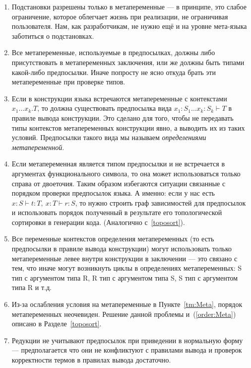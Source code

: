 \begin{enumerate}
\item Подстановки разрешены только в метапеременные --- в принципе, это слабое ограничение, которое облегчает жизнь при реализации, не ограничивая пользователя. Нам, как разработчикам, не нужно ещё и на уровне мета-языка заботиться о подстановках.

\item \label{tm:Meta} Все метапеременные, используемые в предпосылках, должны либо присутствовать в метапеременных заключения, или же должны быть типами какой-либо предпосылки. Иначе попросту не ясно откуда брать эти метапеременные при проверке типов.

\item Если в конструкции языка встречаются метапеременные с контекстами $x_1 \ldots x_k . T$, то должна существовать предпосылка вида $x_1 : S_1 \ldots x_k : S_k  \vdash T$ в правиле вывода конструкции. Это сделано для того, чтобы не передавать типы контекстов метапеременных конструкции явно, а выводить их из таких условий. Предпосылки такого вида мы называем \textit{определениями метапеременной}.

\item Если метапеременная является типом предпосылки и не встречается в аргументах функционального символа, то она может использоваться только справа от двоеточия. Таким образом избегаются ситуации связанные с порядком проверки предпосылок языка. А именно: если у нас есть $x : S \vdash t : T,\ x:T \vdash r : S$, то нужно строить граф зависимостей для предпосылок и использовать порядок полученный в результате его топологической сортировки в генерации кода. (Аналогично с~\ref{toposort}).

\item \label{order:Meta} Все переменные контекстов определения метапеременных (то есть предпосылки в правиле вывода конструкции) могут использовать только метапеременные левее внутри конструкции в заключении --- это связано с тем, что иначе могут возникнуть циклы в определениях метапеременных: S тип с аргументом типа R, R тип с аргументом типа S, S тип с аргументом типа R и т.д.

\item Из-за ослабления условия на метапеременные в Пункте~\ref{tm:Meta}, порядок метапеременных неочевиден. Решение данной проблемы и~(\ref{order:Meta}) описано в Разделе~\ref{toposort}.

\item Редукции не учитывают предпосылок при приведении в нормальную форму --- предполагается что они не конфликтуют с правилами вывода и проверок корректности термов в правилах вывода достаточно.


\end{enumerate}

